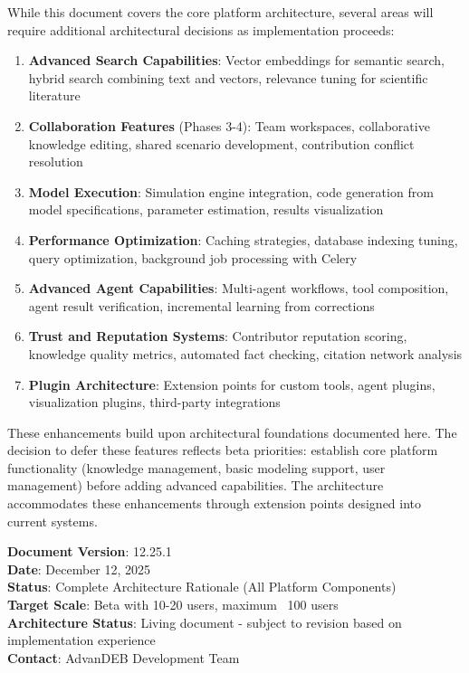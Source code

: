 \documentclass[12pt,a4paper]{article}
\begin{document}
While this document covers the core platform architecture, several areas will require additional architectural decisions as implementation proceeds:

\begin{enumerate}
    \item \textbf{Advanced Search Capabilities}: Vector embeddings for semantic search, hybrid search combining text and vectors, relevance tuning for scientific literature
    \item \textbf{Collaboration Features} (Phases 3-4): Team workspaces, collaborative knowledge editing, shared scenario development, contribution conflict resolution
    \item \textbf{Model Execution}: Simulation engine integration, code generation from model specifications, parameter estimation, results visualization
    \item \textbf{Performance Optimization}: Caching strategies, database indexing tuning, query optimization, background job processing with Celery
    \item \textbf{Advanced Agent Capabilities}: Multi-agent workflows, tool composition, agent result verification, incremental learning from corrections
    \item \textbf{Trust and Reputation Systems}: Contributor reputation scoring, knowledge quality metrics, automated fact checking, citation network analysis
    \item \textbf{Plugin Architecture}: Extension points for custom tools, agent plugins, visualization plugins, third-party integrations
\end{enumerate}

These enhancements build upon architectural foundations documented here. The decision to defer these features reflects beta priorities: establish core platform functionality (knowledge management, basic modeling support, user management) before adding advanced capabilities. The architecture accommodates these enhancements through extension points designed into current systems.

\vspace{1cm}

\noindent\textbf{Document Version}: 12.25.1\\
\textbf{Date}: December 12, 2025\\
\textbf{Status}: Complete Architecture Rationale (All Platform Components)\\
\textbf{Target Scale}: Beta with 10-20 users, maximum ~100 users\\
\textbf{Architecture Status}: Living document - subject to revision based on implementation experience\\
\textbf{Contact}: AdvanDEB Development Team
\end{document}
